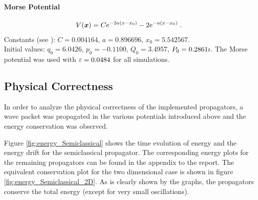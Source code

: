 \paragraph{Morse Potential}
%
\begin{align}
	\label{math:morse}
	V(\bm{x}) = C e^{-2a(x-x_0)} - 2 e^{-a(x-x_0)} \; .
\end{align}
%
Constants (see \cite{Unpublished}): $C = 0.004164$, $a=0.896696$, $x_0 = 5.542567$. \\
Initial values: $q_0 = 6.0426$, $p_0 = -0.1100$, $Q_0 = 3.4957$, $P_0 = 0.2861 \imath$.
The Morse potential was used with $\varepsilon = 0.0484$ for all simulations.


\subsection{Physical Correctness}
\label{subsec:physical}
%
In order to analyze the physical correctness of the implemented propagators, a wave packet was propagated in the various potentials introduced above and the energy conservation was observed.
\par\medskip
%
Figure \ref{fig:energy_Semiclassical} shows the time evolution of energy and the energy drift for the semiclassical propagator. The corresponding energy plots for the remaining propagators can be found in the appendix to the report.
The equivalent conservation plot for the two dimensional case is shown in figure \ref{fig:energy_Semiclassical_2D}.
As is clearly shown by the graphs, the propagators conserve the total energy (except for very small oscillations).
%
